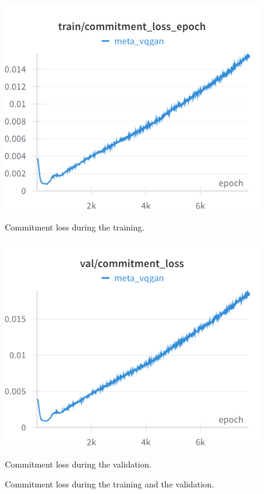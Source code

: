 \begin{figure}[H]
\includegraphics[width=\linewidth]{detailed_engineering/Meta VQGAN/charts/Section-2-Panel-11-4ox8mpc2c.png}
\caption{Commitment loss during the training.}
\endminipage\hfill
{}
\includegraphics[width=\linewidth]{detailed_engineering/Meta VQGAN/charts/Section-4-Panel-2-2k8ixubhi.png}
\caption{Commitment loss during the validation.}
\endminipage
\caption{Commitment loss during the training and the validation.}
\end{figure}


